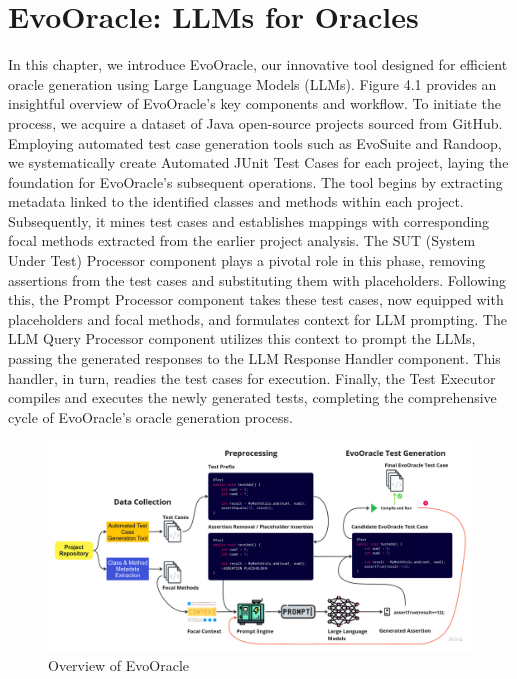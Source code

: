 \chapter{EvoOracle: LLMs for Oracles}
\label{cha:evoOracles}
\vspace{0.4 cm}

In this chapter, we introduce EvoOracle, our innovative tool designed for efficient oracle generation using Large Language Models (LLMs). Figure 4.1 provides an insightful overview of EvoOracle's key components and workflow. To initiate the process, we acquire a dataset of Java open-source projects sourced from GitHub. Employing automated test case generation tools such as EvoSuite and Randoop, we systematically create Automated JUnit Test Cases for each project, laying the foundation for EvoOracle's subsequent operations. The tool begins by extracting metadata linked to the identified classes and methods within each project. Subsequently, it mines test cases and establishes mappings with corresponding focal methods extracted from the earlier project analysis. The SUT (System Under Test) Processor component plays a pivotal role in this phase, removing assertions from the test cases and substituting them with placeholders. Following this, the Prompt Processor component takes these test cases, now equipped with placeholders and focal methods, and formulates context for LLM prompting. The LLM Query Processor component utilizes this context to prompt the LLMs, passing the generated responses to the LLM Response Handler component. This handler, in turn, readies the test cases for execution. Finally, the Test Executor compiles and executes the newly generated tests, completing the comprehensive cycle of EvoOracle's oracle generation process.

\begin{figure}[H]
    \centering
    \includegraphics[width=1\linewidth]{images/evooracle_overview.png}
    \caption{Overview of EvoOracle}
    \label{fig:evooracle_overview}
\end{figure}

